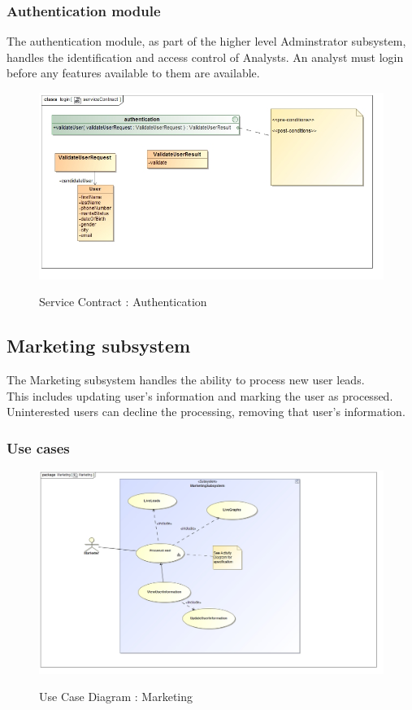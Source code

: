 \documentclass{article}
\begin{document}
		\pagebreak
	\subsubsection{Authentication module}\label{subsubsec:Auth}		
	The authentication module, as part of the higher level Adminstrator subsystem, handles the identification and access control of Analysts. An analyst must login before any features available to them are available.
		\begin{figure}[H]
		\includegraphics[width=\textwidth]{images/class__login__serviceContract.jpg}  \\
		\caption{Service Contract : Authentication}
		\label{fig:authentication}
		\end{figure}
		
		
	\pagebreak
		
\subsection{Marketing subsystem}\label{subsec:marketing}
	The Marketing subsystem handles the ability to process new user leads.\\ This includes updating user's information and marking the user as processed. Uninterested users can decline the processing, removing that user's information.
		\subsubsection{Use cases}
		\begin{figure}[H]
		\includegraphics[width=\textwidth]{images/uc__marketing_scope.jpg}  \\
		\caption{Use Case Diagram : Marketing}
		\end{figure}
\end{document}
